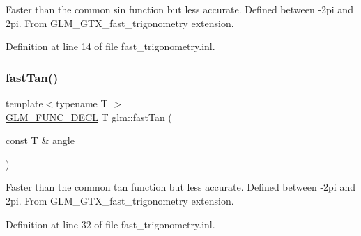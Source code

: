 Faster than the common sin function but less accurate. Defined between -\/2pi and 2pi. From G\+L\+M\+\_\+\+G\+T\+X\+\_\+fast\+\_\+trigonometry extension. 

Definition at line 14 of file fast\+\_\+trigonometry.\+inl.

\mbox{\label{group__gtx__fast__trigonometry_gae6615cdb40d8dc58115a07a21f495561}} 
\subsubsection{\texorpdfstring{fast\+Tan()}{fastTan()}}
{\footnotesize\ttfamily template$<$typename T $>$ \\
\hyperlink{setup_8hpp_ab2d052de21a70539923e9bcbf6e83a51}{G\+L\+M\+\_\+\+F\+U\+N\+C\+\_\+\+D\+E\+CL} T glm\+::fast\+Tan (\begin{DoxyParamCaption}\item[{const T \&}]{angle }\end{DoxyParamCaption})}

Faster than the common tan function but less accurate. Defined between -\/2pi and 2pi. From G\+L\+M\+\_\+\+G\+T\+X\+\_\+fast\+\_\+trigonometry extension. 

Definition at line 32 of file fast\+\_\+trigonometry.\+inl.

